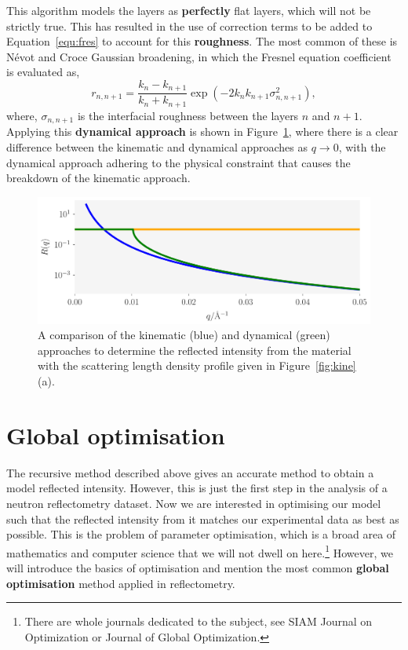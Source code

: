 \documentclass[twoside,symmetric]{tufte-handout}
\begin{document}
This algorithm models the layers as \textbf{perfectly} flat layers, which will not be strictly true. 
This has resulted in the use of correction terms to be added to Equation~\ref{equ:fres} to account for this \textbf{roughness}. 
The most common of these is N\'{e}vot and Croce Gaussian broadening,\cite{nevot_caracterisation_1980} in which the Fresnel equation coefficient is evaluated as, 
%
\begin{equation}
    r_{n, n+1} = \frac{k_n - k_{n+1}}{k_n + k_{n+1}} \exp{(-2k_nk_{n+1}\sigma^2_{n,n+1})},
\end{equation}
%
where, $\sigma_{n, n+1}$ is the interfacial roughness between the layers $n$ and $n+1$. 
Applying this \textbf{dynamical approach} is shown in Figure~\ref{fig:dyna}, where there is a clear difference between the kinematic and dynamical approaches as $q\to0$, with the dynamical approach adhering to the physical constraint that causes the breakdown of the kinematic approach.  
%
\begin{figure}
    \includegraphics[width=\textwidth]{dyna}
    \caption{A comparison of the kinematic (blue) and dynamical (green) approaches to determine the reflected intensity from the material with the scattering length density profile given in Figure~\ref{fig:kine}(a).}
    \label{fig:dyna}
\end{figure}
%

\section{Global optimisation}

The recursive method described above gives an accurate method to obtain a model reflected intensity. 
However, this is just the first step in the analysis of a neutron reflectometry dataset. 
Now we are interested in optimising our model such that the reflected intensity from it matches our experimental data as best as possible. 
This is the problem of parameter optimisation, which is a broad area of mathematics and computer science that we will not dwell on here.\footnote{There are whole journals dedicated to the subject, see SIAM Journal on Optimization or Journal of Global Optimization.}
However, we will introduce the basics of optimisation and mention the most common \textbf{global optimisation} method applied in reflectometry.
\end{document}

